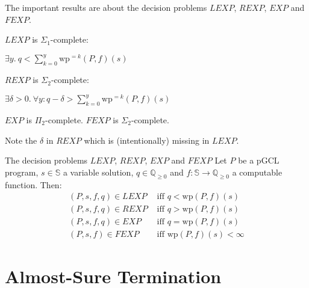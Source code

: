 \documentclass[english]{panikzettel}
\renewcommand{\wp}{\mathrm{wp}}
\newcommand{\rat}{\mathbb{Q}}
\begin{document}
\begin{halfboxl}
    The important results are about the decision problems $LEXP$, $REXP$, $EXP$ and $FEXP$.

    $LEXP$ is $\Sigma_1$-complete:
    \begin{tightcenter}
        $\exists y.\ q < \sum_{k=0}^y \wp^{=k} (P,f)(s)$
    \end{tightcenter}
    \medskip

    $REXP$ is $\Sigma_2$-complete:
    \begin{tightcenter}
        $\exists \delta >0.\ \forall y: q-\delta > \sum_{k=0}^y \wp^{=k}(P,f)(s)$
    \end{tightcenter}
    \medskip

    $EXP$ is $\Pi_2$-complete.
    $FEXP$ is $\Sigma_2$-complete.

    {\footnotesize{} Note the $\delta$ in $REXP$ which is (intentionally) missing in $LEXP$.}
\end{halfboxl}%
\begin{halfboxr}
    \vspace{-\baselineskip}
    \begin{defi}{The decision problems $LEXP$, $REXP$, $EXP$ and $FEXP$}
        Let $P$ be a pGCL program, $s \in \mathbb{S}$ a variable solution, $q \in \rat_{\geq 0}$ and $f: \mathbb{S} \to \rat_{\geq 0}$ a computable function. Then:
        \begin{align*}
            (P,s,f,q) \in LEXP &\text{ iff } q < \wp(P,f)(s) \\
            (P,s,f,q) \in REXP &\text{ iff } q > \wp(P,f)(s) \\
            (P,s,f,q) \in EXP &\text{ iff } q = \wp(P,f)(s) \\
            (P,s,f) \in FEXP &\text{ iff } \wp(P,f)(s) < \infty
        \end{align*}
    \end{defi}
\end{halfboxr}

\section{Almost-Sure Termination}
\end{document}
